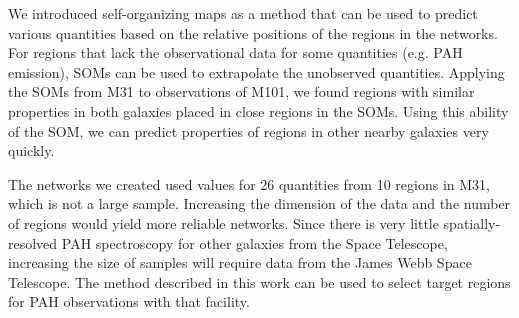 We introduced self-organizing maps as a method that can be used to predict various quantities based on the relative positions of the regions in the networks.
For regions that lack the observational data for some quantities (e.g. PAH emission), SOMs can be used to extrapolate the unobserved quantities.
Applying the SOMs from M31 to observations of M101, we found regions with similar properties in both galaxies placed in close regions in the SOMs.
Using this ability of the SOM, we can predict properties of regions in other nearby galaxies very quickly.

The networks we created used values for 26 quantities from 10 regions in M31, which is not a large sample.
Increasing the dimension of the data and the number of regions would yield more reliable networks.
Since there is very little spatially-resolved PAH spectroscopy for other galaxies from the \Spitzer Space Telescope, increasing the size of samples will require data from the James Webb Space Telescope.
The method described in this work can be used to select target regions for PAH observations with that facility. 





